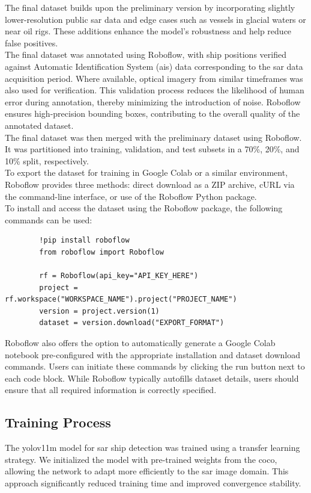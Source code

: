 \documentclass{article}
\begin{document}
	The final dataset builds upon the preliminary version by incorporating slightly lower-resolution public \acrshort{sar} data and edge cases such as vessels in glacial waters or near oil rigs. These additions enhance the model’s robustness and help reduce false positives.\\
	
	The final dataset was annotated using Roboflow, with ship positions verified against Automatic Identification System (\acrshort{ais}) data corresponding to the \acrshort{sar} data acquisition period. Where available, optical imagery from similar timeframes was also used for verification. This validation process reduces the likelihood of human error during annotation, thereby minimizing the introduction of noise. Roboflow ensures high-precision bounding boxes, contributing to the overall quality of the annotated dataset.\\
	
	The final dataset was then merged with the preliminary dataset using Roboflow. It was partitioned into training, validation, and test subsets in a 70\%, 20\%, and 10\% split, respectively.\\
	
	To export the dataset for training in Google Colab or a similar environment, Roboflow provides three methods: direct download as a ZIP archive, cURL via the command-line interface, or use of the Roboflow Python package. \\
	
	To install and access the dataset using the Roboflow package, the following commands can be used:
	\begin{lstlisting}
		!pip install roboflow
		from roboflow import Roboflow
		
		rf = Roboflow(api_key="API_KEY_HERE")
		project = rf.workspace("WORKSPACE_NAME").project("PROJECT_NAME")
		version = project.version(1)
		dataset = version.download("EXPORT_FORMAT")
	\end{lstlisting}
	Roboflow also offers the option to automatically generate a Google Colab notebook pre-configured with the appropriate installation and dataset download commands. Users can initiate these commands by clicking the run button next to each code block. While Roboflow typically autofills dataset details, users should ensure that all required information is correctly specified. \subsection{Training Process}
	The \acrshort{yolov11m} model for \acrshort{sar} ship detection was trained using a transfer learning strategy. We initialized the model with pre-trained weights from the \acrshort{coco}, allowing the network to adapt more efficiently to the \acrshort{sar} image domain. This approach significantly reduced training time and improved convergence stability.\\
	
\end{document}
